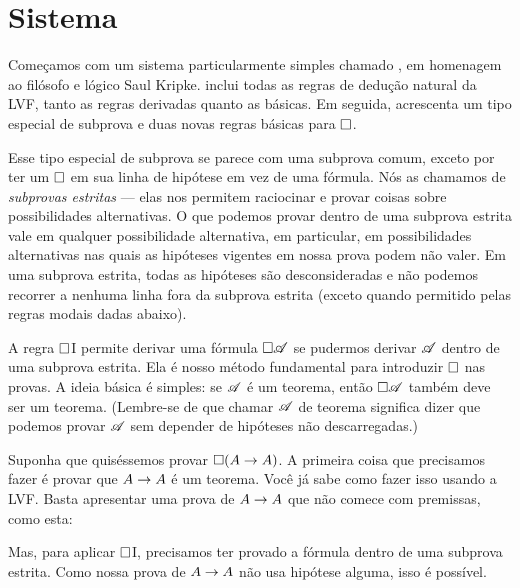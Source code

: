\section{Sistema \mlK}
\label{K}

Começamos com um sistema particularmente simples chamado \mlK, em homenagem ao filósofo e lógico Saul Kripke. \mlK{} inclui todas as regras de dedução natural da LVF, tanto as regras derivadas quanto as básicas. Em seguida, \mlK{} acrescenta um tipo especial de subprova e duas novas regras básicas para $\Box$.

Esse tipo especial de subprova se parece com uma subprova comum, exceto por ter um $\Box{}$ em sua linha de hipótese em vez de uma fórmula. Nós as chamamos de \emph{subprovas estritas} — elas nos permitem raciocinar e provar coisas sobre possibilidades alternativas. O que podemos provar dentro de uma subprova estrita vale em qualquer possibilidade alternativa, em particular, em possibilidades alternativas nas quais as hipóteses vigentes em nossa prova podem não valer. Em uma subprova estrita, todas as hipóteses são desconsideradas e não podemos recorrer a nenhuma linha fora da subprova estrita (exceto quando permitido pelas regras modais dadas abaixo).

A regra $\Box$I permite derivar uma fórmula $\Box \mathscr{A}$ se pudermos derivar $\mathscr{A}$ dentro de uma subprova estrita. Ela é nosso método fundamental para introduzir $\Box{}$ nas provas. A ideia básica é simples: se $\mathscr{A}$ é um teorema, então $\Box \mathscr{A}$ também deve ser um teorema. (Lembre-se de que chamar $\mathscr{A}$ de teorema significa dizer que podemos provar $\mathscr{A}$ sem depender de hipóteses não descarregadas.)

Suponha que quiséssemos provar $\Box(A\rightarrow A)$. A primeira coisa que precisamos fazer é provar que $A\rightarrow A$ é um teorema. Você já sabe como fazer isso usando a LVF. Basta apresentar uma prova de $A\rightarrow A$ que não comece com premissas, como esta:
\begin{fitchproof}
		\open
		\AS
		\close
\end{fitchproof}
Mas, para aplicar $\Box$I, precisamos ter provado a fórmula dentro de uma subprova estrita. Como nossa prova de $A \rightarrow A$ não usa hipótese alguma, isso é possível.
\begin{fitchproof}
		\open
		\AS
		\open
		\AS
		\close
		\close
\end{fitchproof}

